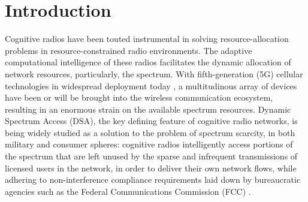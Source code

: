 \documentclass[12pt, draftcls, onecolumn]{IEEEtran}
\newcommand{\add}[1]{{\color{red}{#1}}}
\begin{document}
\section{Introduction}\label{O}
Cognitive radios have been touted \add{as} instrumental in solving resource-allocation problems in resource-constrained radio environments. The adaptive computational intelligence of these radios facilitates the dynamic allocation of \add{scarce} network resources, particularly, the spectrum. With fifth-generation (5G) cellular technologies in widespread deployment today \cite{Ericsson:5Gusecases, WSJ:5Gdominance}, a multitudinous array of devices have been or will be brought into the wireless communication ecosystem, resulting in an enormous strain on the available spectrum resources. Dynamic Spectrum Access (DSA), the key defining feature of cognitive radio networks, is being widely studied as a solution to the problem of spectrum scarcity, in both military and consumer spheres: cognitive radios intelligently access portions of the spectrum that are left unused by the sparse and infrequent transmissions of licensed users in the network, in order to deliver their own network flows, while adhering to non-interference compliance requirements laid down by bureaucratic agencies such as the Federal Communications Commission (FCC) \cite{WSJ:CBRS, WSJ:HolmanJenkinsJr.}.
\end{document}
